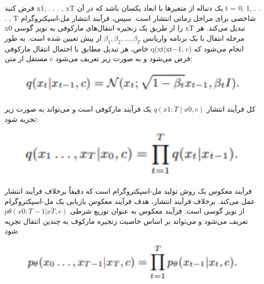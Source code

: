 \documentclass[fleqn]{report}
\begin{document}
فرض کنید x1, . . . , xT یک دنباله از متغیرها با ابعاد یکسان باشد که در آن t = 0, 1, . . . , T شاخصی برای مراحل زمانی انتشار است. سپس، فرآیند انتشار مل-اسپکتروگرام x0 را از طریق یک زنجیره انتقال‌های مارکوفی به نویز گوسی xT تبدیل می‌کند. هر مرحله انتقال با یک برنامه واریانس $\beta_1, \beta_2, ..., \beta_T$ از پیش تعیین شده است. به طور خاص، هر تبدیل مطابق با احتمال انتقال مارکوفی q(xt|xt−1, c) انجام می‌شود که مستقل از متن c فرض می‌شود و به صورت زیر تعریف می‌شود:

\begin{figure}[h]

    \centering
    \includegraphics[width=.6\textwidth, keepaspectratio]{images/eq1.jpg}
    
    \label{fig:eq1}
\end{figure}

کل فرآیند انتشار $q(x1:T∣x0,c)$  یک فرآیند مارکوفی است و می‌تواند به صورت زیر تجزیه شود:

\begin{figure}[h]

    \centering
    \includegraphics[width=.6\textwidth, keepaspectratio]{images/eq2.jpg}
    
    \label{fig:eq2}
\end{figure}

فرآیند معکوس یک روش تولید مل-اسپکتروگرام است که دقیقاً برخلاف فرآیند انتشار عمل می‌کند. برخلاف فرآیند انتشار، هدف فرآیند معکوس بازیابی یک مل-اسپکتروگرام از نویز گوسی است. فرآیند معکوس به عنوان توزیع شرطی $p\theta(x0:T−1|xT, c)$ تعریف می‌شود و می‌تواند بر اساس خاصیت زنجیره مارکوف به چندین انتقال تجزیه شود:

\begin{figure}[h]

    \centering
    \includegraphics[width=.6\textwidth, keepaspectratio]{images/eq3.jpg}
    
    \label{fig:eq3}
\end{figure}
\end{document}
